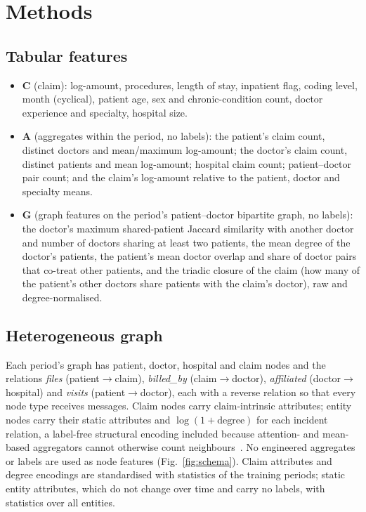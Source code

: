 \documentclass[pdflatex,sn-vancouver-num]{sn-jnl}
\begin{document}
\section{Methods}\label{sec:methods}

\subsection{Tabular features}\label{sec:features}
\begin{itemize}
\item \textbf{C} (claim): log-amount, procedures, length of stay, inpatient flag,
  coding level, month (cyclical), patient age, sex and chronic-condition count,
  doctor experience and specialty, hospital size.
\item \textbf{A} (aggregates within the period, no labels): the patient's claim
  count, distinct doctors and mean/maximum log-amount; the doctor's claim
  count, distinct patients and mean log-amount; hospital claim count;
  patient--doctor pair count; and the claim's log-amount relative to the
  patient, doctor and specialty means.
\item \textbf{G} (graph features on the period's patient--doctor bipartite graph,
  no labels): the doctor's maximum shared-patient Jaccard similarity with
  another doctor and number of doctors sharing at least two patients, the
  mean degree of the doctor's patients, the patient's mean doctor overlap and
  share of doctor pairs that co-treat other patients, and the triadic closure
  of the claim (how many of the patient's other doctors share patients with
  the claim's doctor), raw and degree-normalised.
\end{itemize}

\subsection{Heterogeneous graph}\label{sec:graph}
Each period's graph has patient, doctor, hospital and claim nodes and the
relations \emph{files} (patient$\to$claim), \emph{billed\_by}
(claim$\to$doctor), \emph{affiliated} (doctor$\to$hospital) and \emph{visits}
(patient$\to$doctor), each with a reverse relation so that every node type
receives messages. Claim nodes carry claim-intrinsic attributes; entity nodes
carry their static attributes and $\log(1+\text{degree})$ for each incident
relation, a label-free structural encoding included because attention- and
mean-based aggregators cannot otherwise count neighbours~\cite{xu2019gin}.
No engineered aggregates or labels are used as node features (Fig.~\ref{fig:schema}). Claim
attributes and degree encodings are standardised with statistics of the
training periods; static entity attributes, which do not change over time and
carry no labels, with statistics over all entities.
\end{document}
